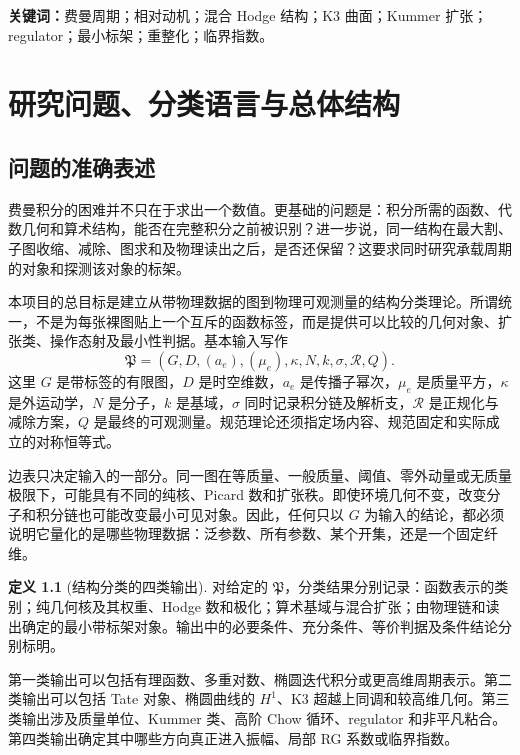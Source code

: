 \documentclass[11pt,a4paper,oneside]{ctexrep}
\theoremstyle{cnplain}
\theoremstyle{definition}
\newtheorem{definition}[theorem]{定义}
\theoremstyle{remark}
\begin{document}
\noindent\textbf{关键词：}费曼周期；相对动机；混合 Hodge 结构；K3 曲面；Kummer 扩张；regulator；最小标架；重整化；临界指数。
\tableofcontents
\clearpage
{}
\chapter{研究问题、分类语言与总体结构}\label{ch:intro}
\section{问题的准确表述}
费曼积分的困难并不只在于求出一个数值。更基础的问题是：积分所需的函数、代数几何和算术结构，能否在完整积分之前被识别？进一步说，同一结构在最大割、子图收缩、减除、图求和及物理读出之后，是否还保留？这要求同时研究承载周期的对象和探测该对象的标架。

本项目的总目标是建立从带物理数据的图到物理可观测量的结构分类理论。所谓统一，不是为每张裸图贴上一个互斥的函数标签，而是提供可以比较的几何对象、扩张类、操作态射及最小性判据。基本输入写作
\begin{equation}\label{eq:input}
 \mathfrak P=(G,D,(a_e),(\mu_e),\kappa,N,k,\sigma,\mathscr R,Q).
\end{equation}
这里 $G$ 是带标签的有限图，$D$ 是时空维数，$a_e$ 是传播子幂次，$\mu_e$ 是质量平方，$\kappa$ 是外运动学，$N$ 是分子，$k$ 是基域，$\sigma$ 同时记录积分链及解析支，$\mathscr R$ 是正规化与减除方案，$Q$ 是最终的可观测量。规范理论还须指定场内容、规范固定和实际成立的对称恒等式。

边表只决定输入的一部分。同一图在等质量、一般质量、阈值、零外动量或无质量极限下，可能具有不同的纯核、Picard 数和扩张秩。即使环境几何不变，改变分子和积分链也可能改变最小可见对象。因此，任何只以 $G$ 为输入的结论，都必须说明它量化的是哪些物理数据：泛参数、所有参数、某个开集，还是一个固定纤维。

\begin{definition}[结构分类的四类输出]
对给定的 $\mathfrak P$，分类结果分别记录：函数表示的类别；纯几何核及其权重、Hodge 数和极化；算术基域与混合扩张；由物理链和读出确定的最小带标架对象。输出中的必要条件、充分条件、等价判据及条件结论分别标明。
\end{definition}

第一类输出可以包括有理函数、多重对数、椭圆迭代积分或更高维周期表示。第二类输出可以包括 Tate 对象、椭圆曲线的 $H^1$、K3 超越上同调和较高维几何。第三类输出涉及质量单位、Kummer 类、高阶 Chow 循环、regulator 和非平凡粘合。第四类输出确定其中哪些方向真正进入振幅、局部 RG 系数或临界指数。
\end{document}
